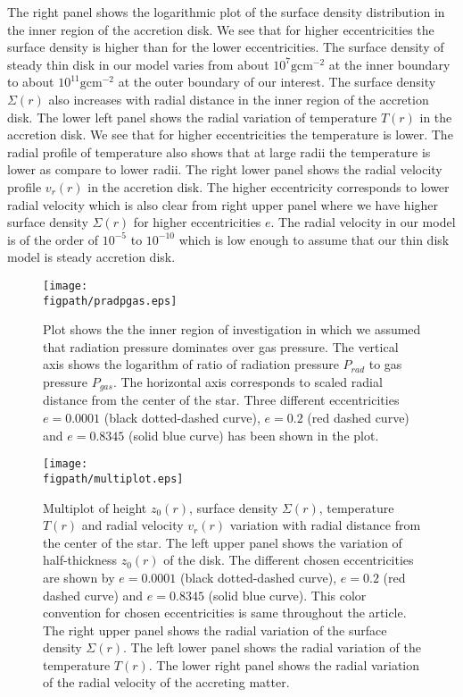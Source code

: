 \documentclass[useAMS,usenatbib]{mn2e}
\newcommand{\figpath}{./Figs/}
\begin{document}
The right panel shows the logarithmic plot of the surface density distribution in the inner region of the accretion disk. We see that for higher eccentricities the surface density is higher than for the lower eccentricities. The surface density of steady thin disk in our model varies from about $10^7 \textrm{g}\textrm{cm}^{-2}$ at the inner boundary to about $10^{11}\textrm{g}\textrm{cm}^{-2}$ at the outer boundary of our interest. The surface density $\Sigma (r)$ also increases with radial distance in the inner region of the accretion disk. The lower left panel shows the radial variation of temperature $T(r)$ in the accretion disk. We see that for higher eccentricities the temperature is lower. The radial profile of temperature also shows that at large radii the temperature is lower as compare to lower radii. The right lower panel shows the radial velocity profile $v_r(r)$ in the accretion disk. The higher eccentricity corresponds to lower radial velocity which is also clear from right upper panel where we have higher surface density $\Sigma(r)$ for higher eccentricities $e$. The radial velocity in our model is of the order of $10^{-5}$ to $10^{-10}$ which is low enough to assume that our thin disk model is steady accretion disk.
\begin{figure}
\centering
\texttt{[image: \\figpath/pradpgas.eps]}
\caption{\small{Plot shows the the inner region of investigation in which we assumed that radiation pressure dominates over gas pressure. The vertical axis shows the logarithm of ratio of radiation pressure $P_{rad}$ to gas pressure $P_{gas}$. The horizontal axis corresponds to scaled radial distance from the center of the star. Three different eccentricities $e = 0.0001$ (black dotted-dashed curve), $e = 0.2$ (red dashed curve) and $e = 0.8345$ (solid blue curve) has been shown in the plot.}}
\label{prpg}
\end{figure}
\begin{figure*}
\centering
\texttt{[image: \\figpath/multiplot.eps]}
\caption{\small{Multiplot of height $z_0(r)$, surface density $\Sigma(r)$, temperature $T(r)$ and radial velocity $v_r(r)$ variation with radial distance from the center of the star. The left upper panel shows the variation of half-thickness $z_0(r)$ of the disk. The different chosen eccentricities are shown by $e = 0.0001$ (black dotted-dashed curve), $e = 0.2$ (red dashed curve) and $e = 0.8345$ (solid blue curve). This color convention for chosen eccentricities is same throughout the article. The right upper panel shows the radial variation of the surface density $\Sigma(r)$. The left lower panel shows the radial variation of the temperature $T(r)$. The lower right panel shows the radial variation of the radial velocity of the accreting matter.}}
\label{steadyplt1}
\end{figure*}
\end{document}
